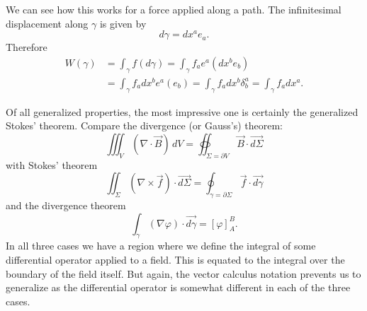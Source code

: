 \documentclass[10pt,twocolumn, nofootinbib]{revtex4-2}
\begin{document}

We can see how this works for a force applied along a path. The infinitesimal displacement along $\gamma$ is given by
\begin{equation*}
	d\gamma = dx^a e_a.
\end{equation*}
Therefore 
\begin{equation*}
	\begin{aligned}
		W(\gamma) &= \int_\gamma f(d\gamma) = \int_\gamma  f_a e^a(dx^b e_b) \\
		&= \int_\gamma  f_a dx^b e^a( e_b)
		= \int_\gamma  f_a dx^b \delta^a_b
		= \int_\gamma  f_a dx^a.
	\end{aligned}
\end{equation*}

Of all generalized properties, the most impressive one is certainly the generalized Stokes' theorem. Compare the divergence (or Gauss's) theorem:
\begin{equation*}
	\iiint_V (\nabla \cdot \vec{B}) \, dV = \oiint_{\Sigma = \partial V} \vec{B} \cdot \vec{d\Sigma}
\end{equation*}
with Stokes' theorem
\begin{equation*}
	\iint_\Sigma (\nabla \times \vec{f}) \cdot \vec{d\Sigma} = \oint_{\gamma = \partial \Sigma} \vec{f} \cdot \vec{d\gamma}
\end{equation*}
and the divergence theorem
\begin{equation*}
	\int_\gamma (\nabla \varphi) \cdot \vec{d\gamma} = \left[ \varphi \right]_A^B .
\end{equation*}
In all three cases we have a region where we define the integral of some differential operator applied to a field. This is equated to the integral over the boundary of the field itself. But again, the vector calculus notation prevents us to generalize as the differential operator is somewhat different in each of the three cases.
\end{document}
